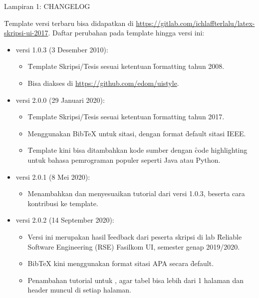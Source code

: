 \begin{flushright}
	Lampiran 1: CHANGELOG
\end{flushright}
\label{appendix:changelog}

\f{Template} versi terbaru bisa didapatkan di \url{https://gitlab.com/ichlaffterlalu/latex-skripsi-ui-2017}.
Daftar perubahan pada \f{template} hingga versi ini:
\begin{itemize}
	\item versi 1.0.3 (3 Desember 2010):
		\begin{itemize}
			\item \f{Template} Skripsi/Tesis sesuai ketentuan \f{formatting} tahun 2008.
			\item Bisa diakses di \url{https://github.com/edom/uistyle}.
		\end{itemize}
	\item versi 2.0.0 (29 Januari 2020):
		\begin{itemize}
			\item \f{Template} Skripsi/Tesis sesuai ketentuan \f{formatting} tahun 2017.
			\item Menggunakan BibTeX untuk sitasi, dengan format \f{default} sitasi IEEE.
			\item \f{Template} kini bisa ditambahkan kode sumber dengan \f{code highlighting} untuk bahasa pemrograman populer seperti Java atau Python.
		\end{itemize}
	\item versi 2.0.1 (8 Mei 2020):
		\begin{itemize}
			\item Menambahkan dan menyesuaikan tutorial dari versi 1.0.3, beserta cara kontribusi ke template.
		\end{itemize}
	\item versi 2.0.2 (14 September 2020):
		\begin{itemize}
			\item Versi ini merupakan hasil \f{feedback} dari peserta skripsi di lab \f{Reliable Software Engineering} (RSE) Fasilkom UI, semester genap 2019/2020.
			\item BibTeX kini menggunakan format sitasi APA secara \f{default}.
			\item Penambahan tutorial untuk , agar tabel bisa lebih dari 1 halaman dan header muncul di setiap halaman.

\end{itemize}
\end{itemize}
